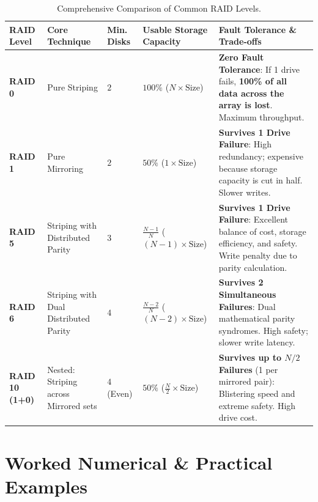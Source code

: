 \begin{table}[htbp]
\centering
\footnotesize
\renewcommand{\arraystretch}{1.3}
\begin{tabularx}{\linewidth}{l>{\raggedright\arraybackslash}p{2.2cm}>{\raggedright\arraybackslash}p{1.8cm}>{\raggedright\arraybackslash}X>{\raggedright\arraybackslash}X}
\toprule
\textbf{RAID Level} & \textbf{Core Technique} & \textbf{Min. Disks} & \textbf{Usable Storage Capacity} & \textbf{Fault Tolerance \& Trade-offs} \\
\midrule
\textbf{RAID 0} & Pure Striping & $2$ & $100\%$ ($N \times \text{Size}$) & \textbf{Zero Fault Tolerance}: If 1 drive fails, \textbf{100\% of all data across the array is lost}. Maximum throughput. \\
\textbf{RAID 1} & Pure Mirroring & $2$ & $50\%$ ($1 \times \text{Size}$) & \textbf{Survives 1 Drive Failure}: High redundancy; expensive because storage capacity is cut in half. Slower writes. \\
\textbf{RAID 5} & Striping with Distributed Parity & $3$ & $\frac{N-1}{N}$ ($(N-1) \times \text{Size}$) & \textbf{Survives 1 Drive Failure}: Excellent balance of cost, storage efficiency, and safety. Write penalty due to parity calculation. \\
\textbf{RAID 6} & Striping with Dual Distributed Parity & $4$ & $\frac{N-2}{N}$ ($(N-2) \times \text{Size}$) & \textbf{Survives 2 Simultaneous Failures}: Dual mathematical parity syndromes. High safety; slower write latency. \\
\textbf{RAID 10 (1+0)} & Nested: Striping across Mirrored sets & $4$ (Even) & $50\%$ ($\frac{N}{2} \times \text{Size}$) & \textbf{Survives up to $N/2$ Failures} (1 per mirrored pair): Blistering speed and extreme safety. High drive cost. \\
\bottomrule
\end{tabularx}
\caption{Comprehensive Comparison of Common RAID Levels.}
\label{tab:raid-levels-master}
\end{table}

\section{Worked Numerical \& Practical Examples}

